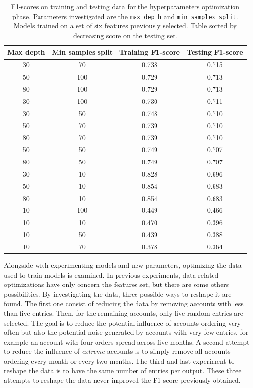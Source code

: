 \begin{table}[htbp]
    \centering
    \begin{tabular}{c|c|c|c}
    \textbf{Max depth} & \textbf{Min samples split} & \textbf{Training F1-score} & \textbf{Testing F1-score} \\ \hline
    30	&  70   &  	0.738  &  0.715 \\
    50	&  100  &  	0.729  &  0.713 \\
    80	&  100  &  	0.729  &  0.713 \\
    30	&  100  &  	0.730  &  0.711 \\
    30	&  50   &  	0.748  &  0.710 \\
    50	&  70   &  	0.739  &  0.710 \\
    80	&  70   &  	0.739  &  0.710 \\
    50	&  50   &  	0.749  &  0.707 \\
    80	&  50   &  	0.749  &  0.707 \\
    30	&  10   &  	0.828  &  0.696 \\
    50	&  10   &  	0.854  &  0.683 \\
    80	&  10   &  	0.854  &  0.683 \\
    10	&  100  &  	0.449  &  0.466 \\
    10	&  10   &  	0.470  &  0.396 \\
    10	&  50   &  	0.439  &  0.388 \\
    10	&  70   &  	0.378  &  0.364 
    \end{tabular}
    \caption[F1-scores for ExtraTree hyperparameters optimization]{F1-scores on training and testing data for the hyperparameters optimization phase. Parameters investigated are the \texttt{max\_depth} and \texttt{min\_samples\_split}. Models trained on a set of six features previously selected. Table sorted by decreasing score on the testing set.}
    \label{tab:tree-fine-tune}
\end{table}

Alongside with experimenting models and new parameters, optimizing the data used to train models is examined. In previous experiments, data-related optimizations have only concern the features set, but there are some others possibilities. By investigating the data, three possible ways to reshape it are found. 
The first one consist of reducing the data by removing accounts with less than five entries. Then, for the remaining accounts, only five random entries are selected. The goal is to reduce the potential influence of accounts ordering very often but also the potential noise generated by accounts with very few entries, for example an account with four orders spread across five months. A second attempt to reduce the influence of \textit{extreme} accounts is to simply remove all accounts ordering every month or every two months. The third and last experiment to reshape the data is to have the same number of entries per output. These three attempts to reshape the data never improved the F1-score previously obtained.

